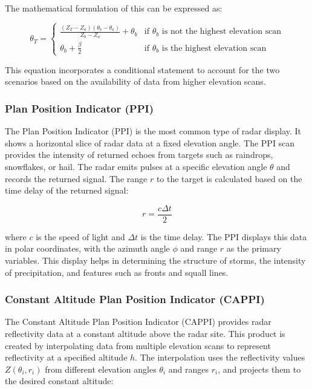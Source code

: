 The mathematical formulation of this can be expressed as:

\[ 
\theta_T = \begin{cases} 
\frac{(Z_T - Z_a)(\theta_b - \theta_a)}{Z_b - Z_a} + \theta_b & \text{if } \theta_b \text{ is not the highest elevation scan} \\
\theta_b + \frac{\beta}{2} & \text{if } \theta_b \text{ is the highest elevation scan} 
\end{cases}
\]

This equation incorporates a conditional statement to account for the two
scenarios based on the availability of data from higher elevation scans.

\subsubsection*{Plan Position Indicator (PPI)}

The Plan Position Indicator (PPI) is the most common type of radar display. It
shows a horizontal slice of radar data at a fixed elevation angle. The PPI scan
provides the intensity of returned echoes from targets such as raindrops,
snowflakes, or hail. The radar emits pulses at a specific elevation angle
$\theta$ and records the returned signal. The range $r$ to the target is
calculated based on the time delay of the returned signal:

\[
r = \frac{c \Delta t}{2}
\]

where $c$ is the speed of light and $\Delta t$ is the time delay. The PPI
displays this data in polar coordinates, with the azimuth angle $\phi$ and range
$r$ as the primary variables. This display helps in determining the structure of
storms, the intensity of precipitation, and features such as fronts and squall
lines.

\subsubsection*{Constant Altitude Plan Position Indicator (CAPPI)}

The Constant Altitude Plan Position Indicator (CAPPI) provides radar
reflectivity data at a constant altitude above the radar site. This product is
created by interpolating data from multiple elevation scans to represent
reflectivity at a specified altitude $h$. The interpolation uses the
reflectivity values $Z(\theta_i, r_i)$ from different elevation angles
$\theta_i$ and ranges $r_i$, and projects them to the desired constant altitude:

